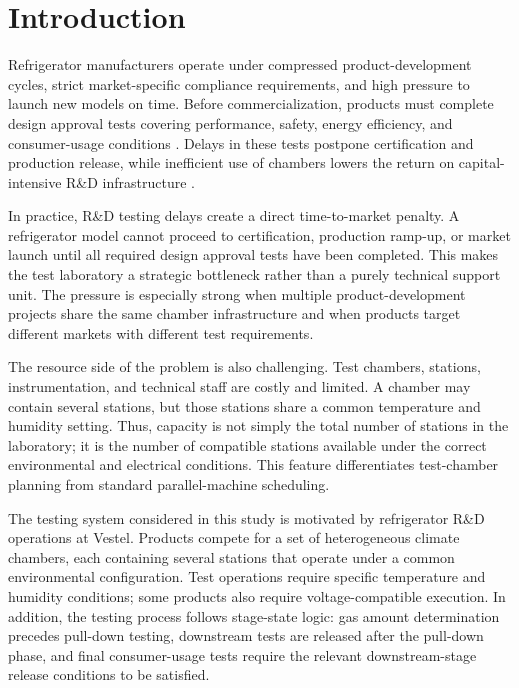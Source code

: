 \documentclass[11pt]{article}
\begin{document}
\section{Introduction}
\label{sec:intro}

Refrigerator manufacturers operate under compressed product-development cycles, strict market-specific compliance requirements, and high pressure to launch new models on time. Before commercialization, products must complete design approval tests covering performance, safety, energy efficiency, and consumer-usage conditions \citep{IEA2021,IEC60335-1,IEC60335-2-24,IEC62552}. Delays in these tests postpone certification and production release, while inefficient use of chambers lowers the return on capital-intensive R\&D infrastructure \citep{OECD_MSTI2024,OECD_MSTI2025}.

In practice, R\&D testing delays create a direct time-to-market penalty. A refrigerator model cannot proceed to certification, production ramp-up, or market launch until all required design approval tests have been completed. This makes the test laboratory a strategic bottleneck rather than a purely technical support unit. The pressure is especially strong when multiple product-development projects share the same chamber infrastructure and when products target different markets with different test requirements.

The resource side of the problem is also challenging. Test chambers, stations, instrumentation, and technical staff are costly and limited. A chamber may contain several stations, but those stations share a common temperature and humidity setting. Thus, capacity is not simply the total number of stations in the laboratory; it is the number of compatible stations available under the correct environmental and electrical conditions. This feature differentiates test-chamber planning from standard parallel-machine scheduling.

The testing system considered in this study is motivated by refrigerator R\&D operations at Vestel. Products compete for a set of heterogeneous climate chambers, each containing several stations that operate under a common environmental configuration. Test operations require specific temperature and humidity conditions; some products also require voltage-compatible execution. In addition, the testing process follows stage-state logic: gas amount determination precedes pull-down testing, downstream tests are released after the pull-down phase, and final consumer-usage tests require the relevant downstream-stage release conditions to be satisfied.
\end{document}

